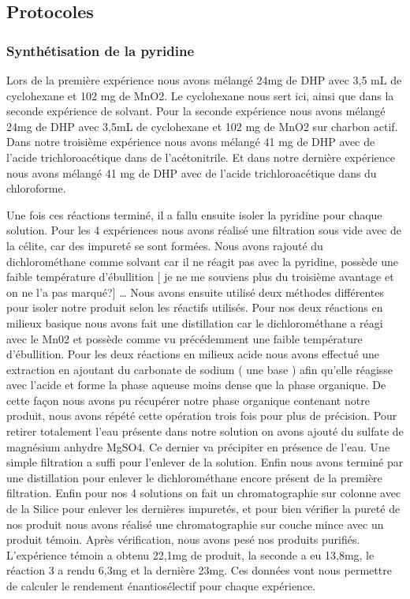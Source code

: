 \documentclass{article}
\begin{document}
\subsection{Protocoles}

\subsubsection{Synthétisation de la pyridine}

Lors de la première expérience nous avons mélangé 24mg de DHP avec 3,5 mL de cyclohexane et 102 mg de MnO2. Le cyclohexane nous sert ici, ainsi que dans la seconde expérience de solvant.
Pour la seconde expérience nous avons mélangé 24mg de DHP avec 3,5mL de cyclohexane et 102 mg de MnO2 sur charbon actif.
Dans notre troisième expérience nous avons mélangé 41 mg de DHP avec de l’acide trichloroacétique dans de l’acétonitrile.
Et dans notre dernière expérience nous avons mélangé 41 mg de DHP avec de l’acide trichloroacétique dans du chloroforme.
\medbreak

Une fois ces réactions terminé, il a fallu ensuite isoler la pyridine pour chaque solution.
\medbreak
Pour les 4 expériences nous avons réalisé une filtration sous vide avec de la célite, car  des impureté se sont formées. Nous avons rajouté du dichlorométhane comme solvant car il ne  réagit pas avec la pyridine, possède une faible température d’ébullition [ je ne me souviens plus du troisième avantage et on ne l’a pas marqué?] …
\medbreak
Nous avons ensuite utilisé deux méthodes différentes pour isoler notre produit selon les réactifs utilisés.
Pour nos deux réactions en milieux basique nous avons fait une distillation car le dichlorométhane a réagi avec le Mn02 et possède comme vu précédemment une faible température d’ébullition.
Pour les deux réactions en milieux acide nous avons effectué une extraction en ajoutant du carbonate de sodium ( une base ) afin qu’elle réagisse avec l’acide et forme la phase aqueuse  moins dense que la phase organique. De cette façon nous avons pu récupérer notre phase organique contenant notre produit, nous avons répété cette opération trois fois pour plus de précision. Pour retirer totalement l’eau présente dans notre solution on avons ajouté du sulfate de magnésium anhydre MgSO4. Ce dernier va précipiter en présence de l’eau. Une simple filtration a suffi pour l’enlever de la solution.  Enfin nous avons terminé par une distillation pour enlever le dichlorométhane encore présent de la première filtration.
Enfin pour nos 4 solutions on fait un chromatographie sur colonne avec de la Silice pour enlever les dernières impuretés, et  pour bien vérifier la pureté de nos produit nous avons réalisé une chromatographie sur couche mince avec un produit témoin.
Après vérification, nous avons pesé nos produits purifiés.
L'expérience témoin a obtenu 22,1mg de produit, la seconde a eu 13,8mg, le réaction 3 a rendu 6,3mg et la dernière 23mg. Ces données vont nous permettre de calculer le rendement énantiosélectif pour chaque expérience.
\end{document}
